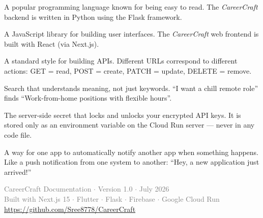 \documentclass[12pt, a4paper]{report}
\newcommand{\cc}{\textit{CareerCraft}}
\begin{document}
\begin{description}[style=nextline, leftmargin=3cm, labelwidth=2.8cm, font=\bfseries\color{ccpurple}]
\item[Python]
A popular programming language known for being easy to read.
The \cc{} backend is written in Python using the Flask framework.

\item[React]
A JavaScript library for building user interfaces.
The \cc{} web frontend is built with React (via Next.js).

\item[REST API]
A standard style for building APIs.
Different URLs correspond to different actions:
GET = read, POST = create, PATCH = update, DELETE = remove.

\item[Semantic Search]
Search that understands meaning, not just keywords.
``I want a chill remote role'' finds ``Work-from-home positions with flexible hours''.

\item[Vault Master Key]
The server-side secret that locks and unlocks your encrypted API keys.
It is stored only as an environment variable on the Cloud Run server --- never in any code file.

\item[Webhook]
A way for one app to automatically notify another app when something happens.
Like a push notification from one system to another: ``Hey, a new application just arrived!''

\end{description}

\vfill
\begin{center}
  \textcolor{graytext}{\small
    CareerCraft Documentation $\cdot$ Version 1.0 $\cdot$ July 2026 \\
    Built with Next.js 15 $\cdot$ Flutter $\cdot$ Flask $\cdot$ Firebase $\cdot$ Google Cloud Run\\[4pt]
    \url{https://github.com/Sree8778/CareerCraft}
  }
\end{center}
\end{document}

